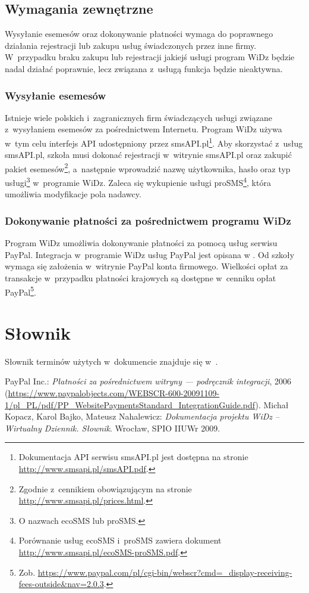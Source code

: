 \documentclass[12pt,leqno,twoside]{mwart}
\begin{document}
\subsection{Wymagania zewnętrzne}
\noindent Wysyłanie esemesów oraz dokonywanie płatności wymaga do poprawnego działania rejestracji lub zakupu usług świadczonych przez inne firmy. W~przypadku braku zakupu lub rejestracji jakiejś usługi program WiDz będzie nadal działać poprawnie, lecz związana z~usługą funkcja będzie nieaktywna.

\subsubsection{Wysyłanie esemesów}\label{WYSYLANIE_SMS}
\noindent Istnieje wiele polskich i~zagranicznych firm świadczących usługi związane z~wysyłaniem esemesów za pośrednictwem Internetu. Program WiDz używa w~tym celu interfejs API udostępniony przez smsAPI.pl\footnote{Dokumentacja API serwisu smsAPI.pl jest dostępna na stronie \url{http://www.smsapi.pl/smsAPI.pdf}.}. Aby skorzystać z~usług smsAPI.pl, szkoła musi dokonać rejestracji w~witrynie smsAPI.pl oraz zakupić pakiet esemesów\footnote{Zgodnie z~cennikiem obowiązującym na stronie \url{http://www.smsapi.pl/prices.html}.}, a~następnie wprowadzić nazwę użytkownika, hasło oraz typ usługi\footnote{O nazwach ecoSMS lub proSMS.} w~programie WiDz. Zaleca się wykupienie usługi proSMS\footnote{Porównanie usług ecoSMS i~proSMS zawiera dokument \hbox{\url{http://www.smsapi.pl/ecoSMS-proSMS.pdf}}.}, która umożliwia modyfikacje pola nadawcy.

\subsubsection{Dokonywanie płatności za pośrednictwem programu WiDz}\label{PLATNOSCI_WIDZ}
\noindent Program WiDz umożliwia dokonywanie płatności za pomocą usług serwisu PayPal. Integracja w~programie WiDz usług PayPal jest opisana w \cite{PAYPAL}. Od szkoły wymaga się założenia w~witrynie PayPal konta firmowego. Wielkości opłat za transakcje w~przypadku płatności krajowych są dostępne w~cenniku opłat PayPal\footnote{Zob. \url{https://www.paypal.com/pl/cgi-bin/webscr?cmd=_display-receiving-fees-outside&nav=2.0.3}.}.

\section{Słownik}
\noindent Słownik terminów użytych w~dokumencie znajduje się w~\cite{SLO}.

\begin{thebibliography}{9}
	 PayPal Inc.: {\it Płatności za pośrednictwem witryny — podręcznik integracji}, 2006 (\url{https://www.paypalobjects.com/WEBSCR-600-20091109-1/pl_PL/pdf/PP_WebsitePaymentsStandard_IntegrationGuide.pdf}).
	 Michał Kopacz, Karol Bajko, Mateusz Nahalewicz: {\it Dokumentacja projektu WiDz -- Wirtualny Dziennik. Słownik}. Wrocław, SPIO IIUWr 2009.
\end{thebibliography}
\end{document}
